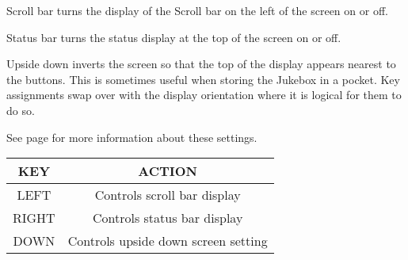 {Scroll bar turns the display of the Scroll bar on the left of the screen
on or off.

Status bar turns the status display at the top of the screen on or off.

Upside down inverts the screen so that the top of the display appears
nearest to the buttons.  This is sometimes useful when storing the
Jukebox in a pocket.  Key assignments swap over with the display
orientation where it is logical for them to do so.

See page \pageref{ref:Displayoptions} for more information about these
settings.

\begin{table}[h!]
  \begin{center}
    \begin{tabular}{|c|c|}
      \hline
      KEY & ACTION \\\hline
      LEFT & Controls scroll bar display \\\hline
      RIGHT & Controls status bar display \\\hline
      DOWN & Controls upside down screen setting \\\hline
    \end{tabular}
  \end{center}
\end{table}
}
